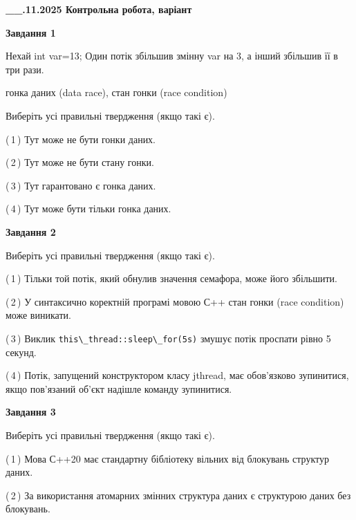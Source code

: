 \documentclass[12pt, ukrainian]{article}
\def\code#1{\Verb!#1!}
\begin{document}
\begin {large}

\textbf{\_\_.11.2025 Контрольна робота, варіант  }\par


{

\begin{center}
\textbf{Завдання 1}
\end{center}
Нехай int var=13; Один потік збільшив змінну var на 3, а інший збільшив її в три рази.

гонка даних (data race), стан гонки (race condition)

Виберіть усі правильні твердження (якщо такі є).\par
\vspace{2mm}
(\,1\,) Тут може не бути гонки даних.%

(\,2\,) Тут може не бути стану гонки.%

(\,3\,) Тут гарантовано є гонка даних.%

(\,4\,) Тут може бути тільки гонка даних.%



\begin{center}
\textbf{Завдання 2}
\end{center}
Виберіть усі правильні твердження (якщо такі є).\par
\vspace{2mm}

(\,1\,) Тільки той потік, який обнулив значення семафора, може його збільшити.%

(\,2\,) У синтаксично коректній програмі мовою С++ стан гонки (race condition) може виникати.%

(\,3\,) Виклик \code{this\_thread::sleep\_for(5s)} змушує потік проспати рівно 5 секунд.%

(\,4\,) Потік, запущений конструктором класу jthread, має обов’язково зупинитися, якщо пов’язаний об’єкт надішле команду зупинитися.%



\begin{center}
\textbf{Завдання 3}
\end{center}
Виберіть усі правильні твердження (якщо такі є).\par
\vspace{2mm}

(\,1\,) Мова С++20 має стандартну бібліотеку вільних від блокувань структур даних.%

(\,2\,) За використання атомарних змінних структура даних є структурою даних без блокувань.%

}
\end{large}
\end{document}
